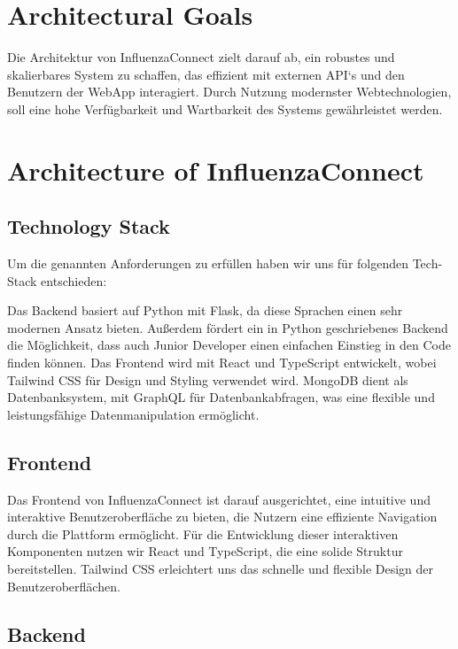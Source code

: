 \documentclass[conference,a4paper,flushend]{cs-techrep}
\begin{document}
\section{Architectural Goals} %
Die Architektur von InfluenzaConnect zielt darauf ab, ein robustes und skalierbares System zu schaffen, das effizient mit externen API‘s  und den Benutzern der WebApp interagiert. Durch Nutzung modernster Webtechnologien, soll eine hohe Verfügbarkeit und Wartbarkeit des Systems gewährleistet werden. 

\section{Architecture of InfluenzaConnect}

\subsection{Technology Stack} %
Um die genannten Anforderungen zu erfüllen haben wir uns für folgenden Tech-Stack entschieden:

 Das Backend basiert auf Python mit Flask, da diese Sprachen einen sehr modernen Ansatz bieten. Außerdem fördert ein in Python geschriebenes Backend die Möglichkeit, dass auch Junior Developer einen einfachen Einstieg in den Code finden können. Das Frontend wird mit React und TypeScript entwickelt, wobei Tailwind CSS für Design und Styling verwendet wird. MongoDB dient als Datenbanksystem, mit GraphQL für Datenbankabfragen, was eine flexible und leistungsfähige Datenmanipulation ermöglicht. 

\subsection{Frontend}

Das Frontend von InfluenzaConnect ist darauf ausgerichtet, eine intuitive und interaktive Benutzeroberfläche zu bieten, die Nutzern eine effiziente Navigation durch die Plattform ermöglicht. Für die Entwicklung dieser interaktiven Komponenten nutzen wir React und TypeScript, die eine solide Struktur bereitstellen. Tailwind CSS erleichtert uns das schnelle und flexible Design der Benutzeroberflächen.

\subsection{Backend}
\end{document}
